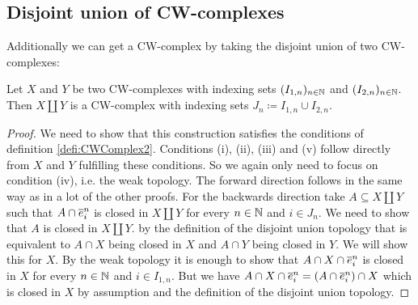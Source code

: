 \subsection{Disjoint union of CW-complexes}

Additionally we can get a CW-complex by taking the disjoint union of two CW-complexes: 

\begin{lem}
    Let $X$ and $Y$ be two CW-complexes with indexing sets $(I_{1,n})_{n \in \bN}$ and $(I_{2, n})_{n \in \bN}$. 
    Then $X \amalg Y$ is a CW-complex with indexing sets $J_n \coloneq I_{1, n} \cup I_{2, n}$.
\end{lem}
\begin{proof}
    We need to show that this construction satisfies the conditions of definition \ref{defi:CWComplex2}. 
    Conditions (i), (ii), (iii) and (v) follow directly from $X$ and $Y$ fulfilling these conditions. 
    So we again only need to focus on condition (iv), i.e. the weak topology. 
    The forward direction follows in the same way as in a lot of the other proofs.
    For the backwards direction take $A \subseteq X \amalg Y$ such that $A \cap \closedCell{n}{i}$ is closed in $X \amalg Y$ for every $n \in \bN$ and $i \in J_n$. 
    We need to show that $A$ is closed in $X \amalg Y$. 
    by the definition of the disjoint union topology that is equivalent to $A \cap X$ being closed in $X$ and $A \cap Y$ being closed in $Y$. 
    We will show this for $X$. 
    By the weak topology it is enough to show that $A \cap X \cap \closedCell{n}{i}$ is closed in $X$ for every $n \in \bN$ and $i \in I_{1, n}$. 
    But we have $A \cap X \cap \closedCell{n}{i} = (A \cap \closedCell{n}{i}) \cap X$ which is closed in $X$ by assumption and the definition of the disjoint union topology.
\end{proof}